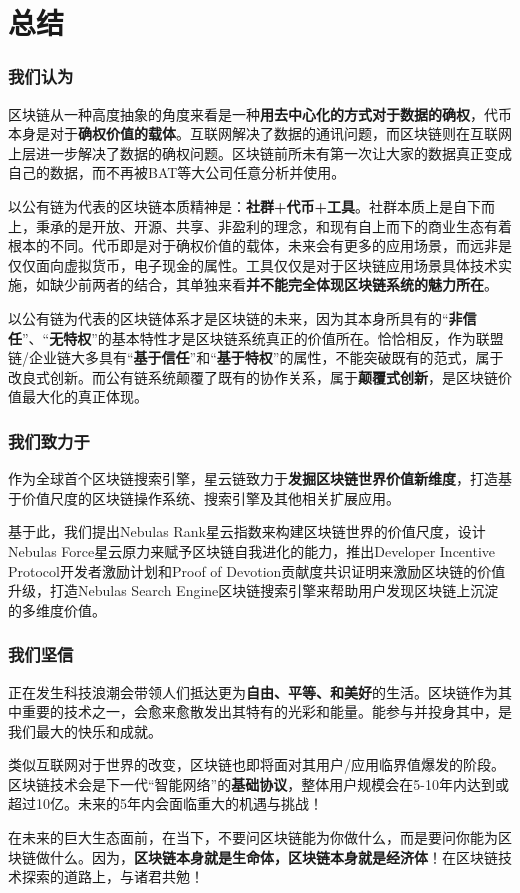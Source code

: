 \section{总结}
\label{sec:conclusion}

\subsubsection*{我们认为}

区块链从一种高度抽象的角度来看是一种\textbf{用去中心化的方式对于数据的确权}，代币本身是对于\textbf{确权价值的载体}。互联网解决了数据的通讯问题，而区块链则在互联网上层进一步解决了数据的确权问题。区块链前所未有第一次让大家的数据真正变成自己的数据，而不再被BAT等大公司任意分析并使用。

以公有链为代表的区块链本质精神是：\textbf{社群+代币+工具}。社群本质上是自下而上，秉承的是开放、开源、共享、非盈利的理念，和现有自上而下的商业生态有着根本的不同。代币即是对于确权价值的载体，未来会有更多的应用场景，而远非是仅仅面向虚拟货币，电子现金的属性。工具仅仅是对于区块链应用场景具体技术实施，如缺少前两者的结合，其单独来看\textbf{并不能完全体现区块链系统的魅力所在}。

以公有链为代表的区块链体系才是区块链的未来，因为其本身所具有的“\textbf{非信任}”、“\textbf{无特权}”的基本特性才是区块链系统真正的价值所在。恰恰相反，作为联盟链/企业链大多具有“\textbf{基于信任}”和“\textbf{基于特权}”的属性，不能突破既有的范式，属于改良式创新。而公有链系统颠覆了既有的协作关系，属于\textbf{颠覆式创新}，是区块链价值最大化的真正体现。

\subsubsection*{我们致力于}

作为全球首个区块链搜索引擎，星云链致力于\textbf{发掘区块链世界价值新维度}，打造基于价值尺度的区块链操作系统、搜索引擎及其他相关扩展应用。

基于此，我们提出Nebulas Rank星云指数来构建区块链世界的价值尺度，设计Nebulas Force星云原力来赋予区块链自我进化的能力，推出Developer Incentive Protocol开发者激励计划和Proof of Devotion贡献度共识证明来激励区块链的价值升级，打造Nebulas Search Engine区块链搜索引擎来帮助用户发现区块链上沉淀的多维度价值。

\subsubsection*{我们坚信}

正在发生科技浪潮会带领人们抵达更为\textbf{自由、平等、和美好}的生活。区块链作为其中重要的技术之一，会愈来愈散发出其特有的光彩和能量。能参与并投身其中，是我们最大的快乐和成就。

类似互联网对于世界的改变，区块链也即将面对其用户/应用临界值爆发的阶段。区块链技术会是下一代“智能网络”的\textbf{基础协议}，整体用户规模会在5-10年内达到或超过10亿。未来的5年内会面临重大的机遇与挑战！

在未来的巨大生态面前，在当下，不要问区块链能为你做什么，而是要问你能为区块链做什么。因为，\textbf{区块链本身就是生命体，区块链本身就是经济体}！在区块链技术探索的道路上，与诸君共勉！
